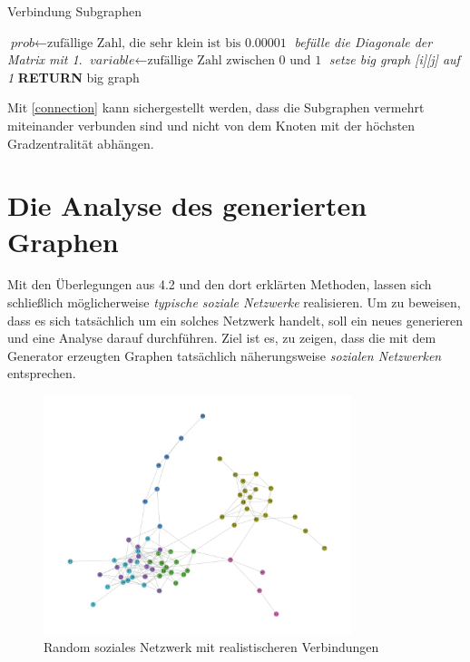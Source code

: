 \begin{algorithm}
\caption{Verbindung Subgraphen}\label{connection}
\begin{algorithmic}[1]
\State $\textit{prob} \gets \text{zufällige Zahl, die sehr klein ist bis 0.00001}$
\State \textit{befülle die Diagonale der Matrix mit 1}.
\EndFor
{}
\State $\textit{variable} \gets \text{zufällige Zahl zwischen 0 und 1}$
\State \textit{setze big graph [i][j] auf 1}
\EndIf
\EndFor
\EndFor
\textbf{RETURN} big graph
\EndProcedure
\end{algorithmic}
\end{algorithm}

Mit \ref{connection} kann sichergestellt werden, dass die Subgraphen vermehrt miteinander verbunden sind und nicht von dem Knoten mit der höchsten Gradzentralität abhängen.

\section{Die Analyse des generierten Graphen}
Mit den Überlegungen aus 4.2 und den dort erklärten Methoden, lassen sich schließlich möglicherweise \textit{typische soziale Netzwerke} realisieren. Um zu beweisen, dass es sich tatsächlich um ein solches Netzwerk handelt, soll ein neues generieren und eine Analyse darauf durchführen. Ziel ist es, zu zeigen, dass die mit dem Generator erzeugten Graphen tatsächlich näherungsweise \textit{sozialen Netzwerken} entsprechen.

\FloatBarrier
\begin{figure}[h!]
    \centering
    \hspace*{-2cm}
    \includegraphics[width=0.8\textwidth]{Graphics/Random_moreConnections.jpg}
    \caption{Random soziales Netzwerk mit realistischeren Verbindungen}
    \label{fig:SNA}
\end{figure}

